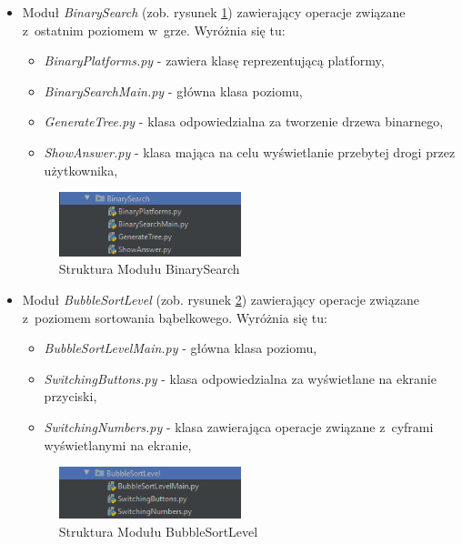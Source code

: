 \documentclass[12pt,a4paper,oneside]{book}
\theoremstyle{definition}
\numberwithin{equation}{chapter}
\begin{document}
\begin{itemize}
    \item Moduł \textit{BinarySearch} (zob. rysunek \ref{StrukturaBinarySearch}) zawierający operacje związane z~ostatnim poziomem w~grze. Wyróżnia się tu:
        \begin{itemize}
            \item \textit{BinaryPlatforms.py} - zawiera klasę reprezentującą platformy,
            \item \textit{BinarySearchMain.py} - główna klasa poziomu,
            \item \textit{GenerateTree.py} - klasa odpowiedzialna za tworzenie drzewa binarnego,
            \item \textit{ShowAnswer.py} - klasa mająca na celu wyświetlanie przebytej drogi przez użytkownika,
        \end{itemize}
        \begin{figure}[hpt!]
            \centering
            \includegraphics[width=0.5\textwidth]{ProjectStructure/strukturaBinarySearch.png}
            \caption{Struktura Modułu BinarySearch}
            \label{StrukturaBinarySearch}
        \end{figure}
    \item Moduł \textit{BubbleSortLevel} (zob. rysunek \ref{StrukturaBubbleSort}) zawierający operacje związane z~poziomem sortowania bąbelkowego. Wyróżnia się tu:
        \begin{itemize}
            \item \textit{BubbleSortLevelMain.py} - główna klasa poziomu,
            \item \textit{SwitchingButtons.py} - klasa odpowiedzialna za wyświetlane na ekranie przyciski,
            \item \textit{SwitchingNumbers.py} - klasa zawierająca operacje związane z~cyframi wyświetlanymi na ekranie,
        \end{itemize}
        \begin{figure}[hpt!]
            \centering
            \includegraphics[width=0.5\textwidth]{ProjectStructure/strukturabubble.png}
            \caption{Struktura Modułu BubbleSortLevel}
            \label{StrukturaBubbleSort}
        \end{figure}
    

\end{itemize}
\end{document}

